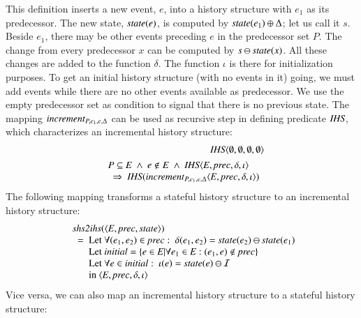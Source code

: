 \documentclass{elsarticle}
\def\id#1{\text{\em #1\/}}
\def\Events{{\mathit E}}
\begin{document}
	This definition inserts a new event, $e$, into a history structure with $e_1$ as its predecessor.
	The new state, $\id{state}(e)$, is computed by $\id{state}(e_1)\oplus\Delta$; let us call it $s$.
	Beside $e_1$, there may be other events preceding $e$ in the predecessor set $P$.
	The change from every predecessor $x$ can be computed by $s\ominus\id{state}(x)$.
	All these changes are added to the function $\delta$.
	The function $\iota$ is there for initialization purposes.
	To get an initial history structure (with no events in it) going,
	we must add events while there are no other events available as predecessor.
	We use the empty predecessor set as condition to signal that there is no previous state.
	The mapping $\id{increment}_{P,e_1,e,\Delta}$ can be used as recursive step in defining predicate $\id{IHS}$,
	which characterizes an incremental history structure:
\begin{eqnarray}
	&&\id{IHS}\la \emptyset, \emptyset, \emptyset, \emptyset\ra\\
&&\begin{array}{@{}l}
	P\subseteq\Events\ \wedge\ e\notin E\ \wedge\ \id{IHS}\la \Events, \id{prec}, \delta, \iota\ra\\
	\ \ \Rightarrow\ \id{IHS}(\id{increment}_{P,e_1,e,\Delta}\la \Events, \id{prec}, \delta, \iota\ra)
\end{array}
\label{req:recursive def IHS}
\end{eqnarray}
The following mapping transforms a stateful history structure to an incremental history structure:
\begin{eqnarray}
&&\begin{array}{l}
	\id{shs2ihs}(\la\Events, \id{prec}, \id{state}\ra)\\
	\ \ =\ \begin{array}[t]{@{}l}
		\text{Let }\forall(e_1,e_2)\in\id{prec}:\ \delta(e_1,e_2)=\id{state}(e_2)\ominus\id{state}(e_1)\\
		\text{Let }\id{initial}=\{e\in\Events|\forall e_1\in\Events: (e_1,e)\notin\id{prec}\}\\
		\text{Let }\forall e\in\id{initial}:\ \iota(e)=\id{state}(e)\ominus\mathcal I\\
		\text{in }\la\Events, \id{prec}, \delta, \iota\ra
		\end{array}
\end{array}
\label{req:shs2ihs}
\end{eqnarray}
	Vice versa, we can also map an incremental history structure to a stateful history structure:
\end{document}
